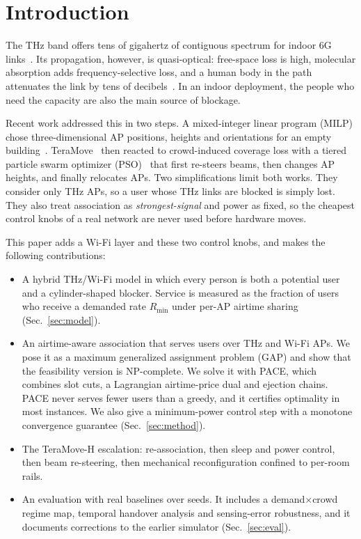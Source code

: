 \documentclass[conference]{IEEEtran}
\newcommand{\Rmin}{R_{\min}}
\begin{document}
\section{Introduction}
The THz band offers tens of gigahertz of contiguous spectrum for indoor 6G links~\cite{akyildiz2014thz,rappaport2019above100}.
Its propagation, however, is quasi-optical: free-space loss is high, molecular absorption adds frequency-selective loss, and a human body in the path attenuates the link by tens of decibels~\cite{petrov2017interference,gapeyenko2017temporal}.
In an indoor deployment, the people who need the capacity are also the main source of blockage.

Recent work addressed this in two steps.
A mixed-integer linear program (MILP) chose three-dimensional AP positions, heights and orientations for an empty building~\cite{anon2026milp}.
TeraMove~\cite{anon2026teramove} then reacted to crowd-induced coverage loss with a tiered particle swarm optimizer (PSO)~\cite{kennedy1995pso,shi1998pso} that first re-steers beams, then changes AP heights, and finally relocates APs.
Two simplifications limit both works.
They consider only THz APs, so a user whose THz links are blocked is simply lost.
They also treat association as \emph{strongest-signal} and power as fixed, so the cheapest control knobs of a real network are never used before hardware moves.

This paper adds a Wi-Fi layer and these two control knobs, and makes the following contributions:
\begin{itemize}
\item A hybrid THz/Wi-Fi model in which every person is both a potential user and a cylinder-shaped blocker.
Service is measured as the fraction of users who receive a demanded rate $\Rmin$ under per-AP airtime sharing (Sec.~\ref{sec:model}).
\item An airtime-aware association that serves users over THz and Wi-Fi APs.
We pose it as a maximum generalized assignment problem (GAP) and show that the feasibility version is NP-complete.
We solve it with PACE, which combines slot cuts, a Lagrangian airtime-price dual and ejection chains.
PACE never serves fewer users than a greedy, and it certifies optimality in most instances.
We also give a minimum-power control step with a monotone convergence guarantee (Sec.~\ref{sec:method}).
\item The TeraMove-H escalation: re-association, then sleep and power control, then beam re-steering, then mechanical reconfiguration confined to per-room rails.
\item An evaluation with real baselines over \MainSeeds{} seeds.
It includes a demand$\times$crowd regime map, temporal handover analysis and sensing-error robustness, and it documents corrections to the earlier simulator (Sec.~\ref{sec:eval}).
\end{itemize}
\end{document}
